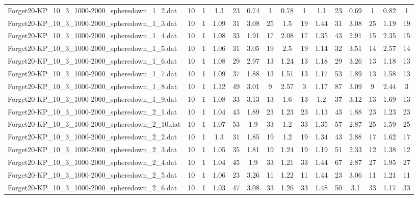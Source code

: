 \begin{table}[!ht]
{\begin{tabular}{lcccccccccccccc}
Forget20-KP\_10\_3\_1000-2000\_spheredown\_1\_2.dat & 10 & 1 & 1.3 & 23 & 0.74 & 1 & 0.78 & 1 & 1.1 & 23 & 0.69 & 1 & 0.82 & 1 \\
Forget20-KP\_10\_3\_1000-2000\_spheredown\_1\_3.dat & 10 & 1 & 1.09 & 31 & 3.08 & 25 & 1.5 & 19 & 1.44 & 31 & 3.08 & 25 & 1.19 & 19 \\
Forget20-KP\_10\_3\_1000-2000\_spheredown\_1\_4.dat & 10 & 1 & 1.08 & 33 & 1.91 & 17 & 2.08 & 17 & 1.35 & 43 & 2.91 & 15 & 2.35 & 15 \\
Forget20-KP\_10\_3\_1000-2000\_spheredown\_1\_5.dat & 10 & 1 & 1.06 & 31 & 3.05 & 19 & 2.5 & 19 & 1.14 & 32 & 3.51 & 14 & 2.57 & 14 \\
Forget20-KP\_10\_3\_1000-2000\_spheredown\_1\_6.dat & 10 & 1 & 1.08 & 29 & 2.97 & 13 & 1.24 & 13 & 1.18 & 29 & 3.26 & 13 & 1.18 & 13 \\
Forget20-KP\_10\_3\_1000-2000\_spheredown\_1\_7.dat & 10 & 1 & 1.09 & 37 & 1.88 & 13 & 1.51 & 13 & 1.17 & 53 & 1.89 & 13 & 1.58 & 13 \\
Forget20-KP\_10\_3\_1000-2000\_spheredown\_1\_8.dat & 10 & 1 & 1.12 & 49 & 3.01 & 9 & 2.57 & 3 & 1.17 & 87 & 3.09 & 9 & 2.44 & 3 \\
Forget20-KP\_10\_3\_1000-2000\_spheredown\_1\_9.dat & 10 & 1 & 1.08 & 33 & 3.13 & 13 & 1.6 & 13 & 1.2 & 37 & 3.12 & 13 & 1.69 & 13 \\
Forget20-KP\_10\_3\_1000-2000\_spheredown\_2\_1.dat & 10 & 1 & 1.04 & 43 & 1.89 & 23 & 1.23 & 23 & 1.13 & 43 & 1.88 & 23 & 1.23 & 23 \\
Forget20-KP\_10\_3\_1000-2000\_spheredown\_2\_10.dat & 10 & 1 & 1.07 & 53 & 1.9 & 33 & 1.2 & 33 & 1.35 & 57 & 2.87 & 25 & 1.59 & 25 \\
Forget20-KP\_10\_3\_1000-2000\_spheredown\_2\_2.dat & 10 & 1 & 1.3 & 31 & 1.85 & 19 & 1.2 & 19 & 1.34 & 43 & 2.88 & 17 & 1.62 & 17 \\
Forget20-KP\_10\_3\_1000-2000\_spheredown\_2\_3.dat & 10 & 1 & 1.05 & 35 & 1.81 & 19 & 1.24 & 19 & 1.19 & 51 & 2.33 & 12 & 1.38 & 12 \\
Forget20-KP\_10\_3\_1000-2000\_spheredown\_2\_4.dat & 10 & 1 & 1.04 & 45 & 1.9 & 33 & 1.21 & 33 & 1.44 & 67 & 2.87 & 27 & 1.95 & 27 \\
Forget20-KP\_10\_3\_1000-2000\_spheredown\_2\_5.dat & 10 & 1 & 1.06 & 23 & 3.26 & 11 & 1.22 & 11 & 1.44 & 23 & 3.06 & 11 & 1.21 & 11 \\
Forget20-KP\_10\_3\_1000-2000\_spheredown\_2\_6.dat & 10 & 1 & 1.03 & 47 & 3.08 & 33 & 1.26 & 33 & 1.48 & 50 & 3.1 & 33 & 1.17 & 33 \\

\end{tabular}}
\end{table}
